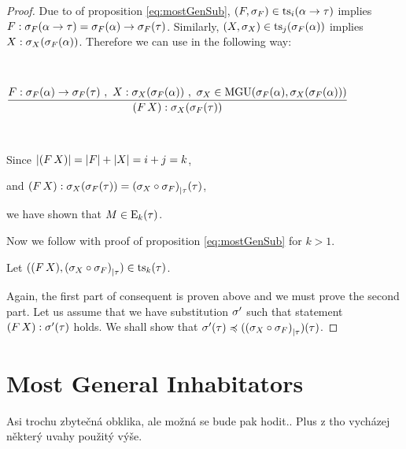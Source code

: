 \documentclass[a4paper,oneside]{memoir}
\begin{document}
\begin{proposition}
\begin{proof}
Due to \IH of proposition \ref{eq:mostGenSub}, 
$(F,\sigma_{F}) \in \operatorname{ts}_{i}(\alpha \rightarrow \tau)$ implies $F : \sigma_{F}(\alpha \rightarrow \tau) = \sigma_{F}(\alpha) \rightarrow \sigma_{F}(\tau)$.
Similarly, $(X,\sigma_{X}) \in \operatorname{ts}_{j}(\sigma_{F}(\alpha))$ implies $X : \sigma_{X}(\sigma_{F}(\alpha))$.
Therefore we can use \mguMp in the following way:

~

$\dfrac{F : \sigma_{F}(\alpha) \rightarrow \sigma_{F}(\tau)\ ,\ X : \sigma_{X}(\sigma_{F}(\alpha))\ , \ \sigma_{X} \in \operatorname{MGU}(\sigma_{F}(\alpha),\sigma_{X}(\sigma_{F}(\alpha)))}{(F\,X) : \sigma_{X}(\sigma_{F}(\tau))}$

~


Since $\lvert (F\,X) \rvert = \lvert F \rvert + \lvert X \rvert = i + j = k$, 

and $(F\,X) : \sigma_{X}(\sigma_{F}(\tau)) = {(\sigma_{X} \circ \sigma_{F})}_{\mid \tau}(\tau)$,

we have shown that $M \in \operatorname{E}_{k}(\tau)$.

Now we follow with proof of proposition \ref{eq:mostGenSub} for $k > 1$.

Let $((F\,X),{(\sigma_{X} \circ \sigma_{F})}_{\mid \tau}) \in \operatorname{ts}_{k}(\tau)$.

Again, the first part of consequent is proven above and we must prove the second part.
Let us assume that we have substitution $\sigma^\prime$ such that 
statement $(F\,X) : \sigma^\prime(\tau)$ holds. We shall show that $\sigma^\prime(\tau) \preccurlyeq ({(\sigma_{X} \circ \sigma_{F})}_{\mid \tau})(\tau)$.








\end{proof}

\end{proposition}



\section{Most General Inhabitators}

Asi trochu zbytečná obklika, ale možná se bude pak hodit.. Plus z tho vycházej některý uvahy použitý výše.
\end{document}
